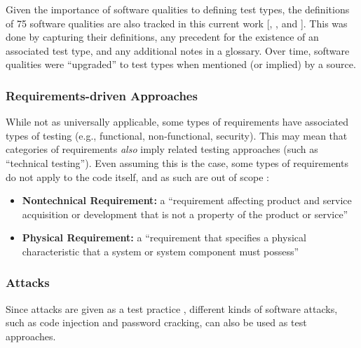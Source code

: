 Given the importance of software qualities to defining test types, the
definitions of 75 software qualities are also tracked in this current work%
[, , and ].
This was done by capturing their definitions, any precedent for the existence
of an associated test type, and any additional notes in a glossary. Over time,
software qualities were ``upgraded''
to test types when mentioned (or implied) by a source.

\subsubsection{Requirements-driven Approaches}
While not as universally applicable, some types of requirements have associated
types of testing (e.g., functional, non-functional, security). This may mean
that categories of requirements \emph{also} imply related testing approaches
(such as ``technical testing''). \ifnotpaper Even assuming this is the case, some types of
      requirements do not apply to the code itself, and as such are out of scope%
      :

      \begin{itemize}
            \item \textbf{Nontechnical Requirement:} a ``requirement affecting product
                  and service acquisition or development that is not a property of
                  the product or service'' \citep[p.~293]{IEEE2017}
            \item \textbf{Physical Requirement:} a ``requirement that specifies a
                  physical characteristic that a system or system component must
                  possess'' \citep[p.~322]{IEEE2017}
      \end{itemize}
\fi

\subsubsection{Attacks}
\label{attacks}
Since attacks are given as a test practice \citep[p.~34]{IEEE2022}, different
kinds of software attacks, such as code injection and password cracking, can
also be used as test approaches.
